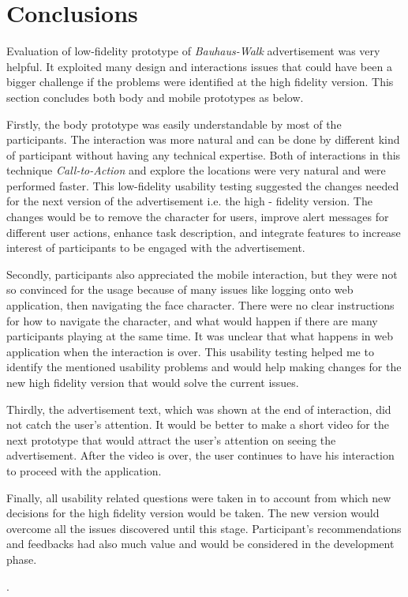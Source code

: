\section{Conclusions}

Evaluation of low-fidelity prototype of \emph{Bauhaus-Walk} advertisement was very helpful. It exploited many design and interactions issues that could have been a bigger challenge if the problems were identified at the high fidelity version. This section concludes both body and mobile prototypes as below.

Firstly, the body prototype was easily understandable by most of the participants. The interaction was more natural and can be done by different kind of participant without having any technical expertise. Both of interactions in this technique \emph{Call-to-Action} and explore the locations were very natural and were performed faster. This low-fidelity usability testing suggested the changes needed for the next version of the advertisement i.e. the high - fidelity version. The changes would be to remove the character for users, improve alert messages for different user actions, enhance task description, and integrate features to increase interest of participants to be engaged with the advertisement.

Secondly, participants also appreciated the mobile interaction, but they were not so convinced for the usage because of many issues like logging onto web application, then navigating the face character. There were no clear instructions for how to navigate the character, and what would happen if there are many participants playing at the same time. It was unclear that what happens in web application when the interaction is over. This usability testing helped me to identify the mentioned usability problems and would help making changes for the new high fidelity version that would solve the current issues.

Thirdly, the advertisement text, which was shown at the end of interaction, did not catch the user's attention. It would be better to make a short video for the next prototype that would attract the user's attention on seeing the advertisement. After the video is over, the user continues to have his interaction to proceed with the application.

Finally, all usability related questions were taken in to account from which new decisions for the high fidelity version would be taken. The new version would overcome all the issues discovered until this stage. Participant’s recommendations and feedbacks had also much value and would be considered in the development phase.


\newpage
.
